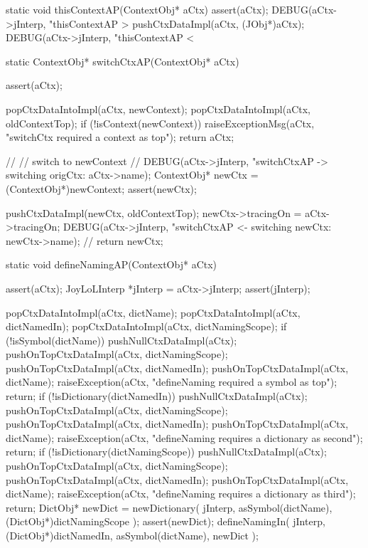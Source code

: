 \startCCode
static void thisContextAP(ContextObj* aCtx) {
  assert(aCtx);
  DEBUG(aCtx->jInterp, "thisContextAP > %
  pushCtxDataImpl(aCtx, (JObj*)aCtx);
  DEBUG(aCtx->jInterp, "thisContextAP < %
}
\stopCCode

\startCCode
static ContextObj* switchCtxAP(ContextObj* aCtx) {
  assert(aCtx);

  popCtxDataIntoImpl(aCtx, newContext);
  popCtxDataIntoImpl(aCtx, oldContextTop);
  if (!isContext(newContext)) {
    raiseExceptionMsg(aCtx,
      "switchCtx required a context as top");
    return aCtx;
  }
  
  //
  // switch to newContext
  //
  DEBUG(aCtx->jInterp, "switchCtxAP -> switching origCtx: %
    aCtx->name);
  ContextObj* newCtx = (ContextObj*)newContext;
  assert(newCtx);

  pushCtxDataImpl(newCtx, oldContextTop);
  newCtx->tracingOn = aCtx->tracingOn;
  DEBUG(aCtx->jInterp, "switchCtxAP <- switching newCtx: %
            newCtx->name);
  //
  return newCtx;
}
\stopCCode

\startCCode
static void defineNamingAP(ContextObj* aCtx) {
  assert(aCtx);
  JoyLoLInterp *jInterp = aCtx->jInterp;
  assert(jInterp);
  
  popCtxDataIntoImpl(aCtx, dictName);
  popCtxDataIntoImpl(aCtx, dictNamedIn);
  popCtxDataIntoImpl(aCtx, dictNamingScope);
  if (!isSymbol(dictName)) {
    pushNullCtxDataImpl(aCtx);
    pushOnTopCtxDataImpl(aCtx, dictNamingScope);
    pushOnTopCtxDataImpl(aCtx, dictNamedIn);
    pushOnTopCtxDataImpl(aCtx, dictName);
    raiseException(aCtx,
      "defineNaming required a symbol as top");
    return;
  }
  if (!isDictionary(dictNamedIn)) {
    pushNullCtxDataImpl(aCtx);
    pushOnTopCtxDataImpl(aCtx, dictNamingScope);
    pushOnTopCtxDataImpl(aCtx, dictNamedIn);
    pushOnTopCtxDataImpl(aCtx, dictName);
    raiseException(aCtx,
      "defineNaming requires a dictionary as second");
    return;
  }
  if (!isDictionary(dictNamingScope)) {
    pushNullCtxDataImpl(aCtx);
    pushOnTopCtxDataImpl(aCtx, dictNamingScope);
    pushOnTopCtxDataImpl(aCtx, dictNamedIn);
    pushOnTopCtxDataImpl(aCtx, dictName);
    raiseException(aCtx,
      "defineNaming requires a dictionary as third");
    return;
  }
  DictObj* newDict =
    newDictionary(
      jInterp,
      asSymbol(dictName),
      (DictObj*)dictNamingScope
    );
  assert(newDict);
  defineNamingIn(
    jInterp,
    (DictObj*)dictNamedIn,
    asSymbol(dictName),
    newDict
  );
}
\stopCCode

